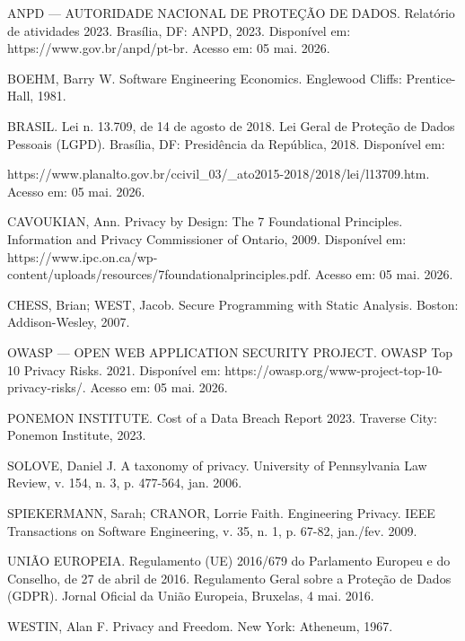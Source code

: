 \documentclass[oneside]{normas-utf-tex}
\begin{document}
ANPD — AUTORIDADE NACIONAL DE PROTEÇÃO DE DADOS. Relatório de atividades 2023. Brasília, DF: ANPD, 2023. Disponível em: https://www.gov.br/anpd/pt-br. Acesso em: 05 mai. 2026.

BOEHM, Barry W. Software Engineering Economics. Englewood Cliffs: Prentice-Hall, 1981.

BRASIL. Lei n. 13.709, de 14 de agosto de 2018. Lei Geral de Proteção de Dados Pessoais (LGPD). Brasília, DF: Presidência da República, 2018. Disponível em:

https://www.planalto.gov.br/ccivil\_03/\_ato2015-2018/2018/lei/l13709.htm. Acesso em: 05 mai. 2026.

CAVOUKIAN, Ann. Privacy by Design: The 7 Foundational Principles. Information and Privacy Commissioner of Ontario, 2009. Disponível em: https://www.ipc.on.ca/wp- content/uploads/resources/7foundationalprinciples.pdf. Acesso em: 05 mai. 2026.

CHESS, Brian; WEST, Jacob. Secure Programming with Static Analysis. Boston: Addison-Wesley, 2007.

OWASP — OPEN WEB APPLICATION SECURITY PROJECT. OWASP Top 10 Privacy Risks. 2021. Disponível em: https://owasp.org/www-project-top-10-privacy-risks/. Acesso em: 05 mai. 2026.

PONEMON INSTITUTE. Cost of a Data Breach Report 2023. Traverse City: Ponemon Institute, 2023.

SOLOVE, Daniel J. A taxonomy of privacy. University of Pennsylvania Law Review, v. 154, n. 3, p. 477-564, jan. 2006.

SPIEKERMANN, Sarah; CRANOR, Lorrie Faith. Engineering Privacy. IEEE Transactions on Software Engineering, v. 35, n. 1, p. 67-82, jan./fev. 2009.

UNIÃO EUROPEIA. Regulamento (UE) 2016/679 do Parlamento Europeu e do Conselho, de 27 de abril de 2016. Regulamento Geral sobre a Proteção de Dados (GDPR). Jornal Oficial da União Europeia, Bruxelas, 4 mai. 2016.

WESTIN, Alan F. Privacy and Freedom. New York: Atheneum, 1967.
\end{document}
